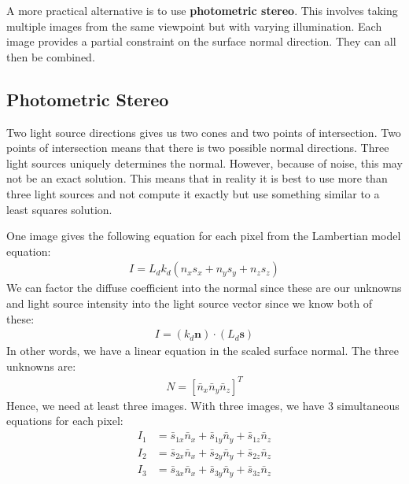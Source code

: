 \documentclass{article}
\begin{document}
A more practical alternative is to use \textbf{photometric stereo}.
This involves taking multiple images from the same viewpoint but with varying illumination.
Each image provides a partial constraint on the surface normal direction.
They can all then be combined.

\subsection{Photometric Stereo}
Two light source directions gives us two cones and two points of intersection.
Two points of intersection means that there is two possible normal directions.
Three light sources uniquely determines the normal.
However, because of noise, this may not be an exact solution.
This means that in reality it is best to use more than three light sources and not compute it exactly but use something similar to a least squares solution.

One image gives the following equation for each pixel from the Lambertian model equation:
\begin{align*}
	I = L_dk_d(n_xs_x + n_ys_y + n_zs_z)
\end{align*}
We can factor the diffuse coefficient into the normal since these are our unknowns and light source intensity into the light source vector since we know both of these:
\begin{align*}
	I = (k_d\textbf{n})\cdot(L_d\textbf{s})
\end{align*}
In other words, we have a linear equation in the scaled surface normal.
The three unknowns are:
\begin{align*}
	N = {[\bar{n}_x \bar{n}_y \bar{n}_z]}^T
\end{align*}
Hence, we need at least three images.
With three images, we have 3 simultaneous equations for each pixel:
\begin{align*}
	I_1 &= \bar{s}_{1x}\bar{n}_x + \bar{s}_{1y}\bar{n}_y + \bar{s}_{1z}\bar{n}_z  \\
	I_2 &= \bar{s}_{2x}\bar{n}_x + \bar{s}_{2y}\bar{n}_y + \bar{s}_{2z}\bar{n}_z  \\
	I_3 &= \bar{s}_{3x}\bar{n}_x + \bar{s}_{3y}\bar{n}_y + \bar{s}_{3z}\bar{n}_z  
\end{align*}
\end{document}
